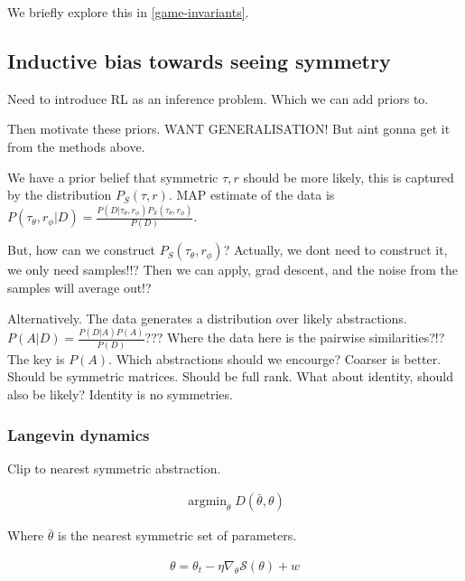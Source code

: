 We briefly explore this in \ref{game-invariants}.


\subsection{Inductive bias towards seeing symmetry}

Need to introduce RL as an inference problem. Which we can add priors to.

Then motivate these priors. WANT GENERALISATION! But aint gonna get it from the
methods above.




We have a prior belief that symmetric $\tau, r$ should be more likely, this is captured by the distribution $P_S(\tau, r)$.
MAP estimate of the data is $P(\tau_{\theta}, r_{\phi}| D) = \frac{P(D | \tau_{\theta}, r_{\phi})P_S(\tau_{\theta}, r_{\phi})}{P(D)}$.

But, how can we construct $P_S(\tau_{\theta}, r_{\phi})$?
Actually, we dont need to construct it, we only need samples!!?
Then we can apply, grad descent, and the noise from the samples will average out!?


Alternatively. The data generates a distribution over likely abstractions.
$P(A|D) = \frac{P(D|A)P(A)}{P(D)}$??? Where the data here is the pairwise similarities?!?
The key is $P(A)$. Which abstractions should we encourge? Coarser is better.
Should be symmetric matrices. Should be full rank. What about identity, should also be likely?
Identity is no symmetries.

\subsubsection{Langevin dynamics}

Clip to nearest symmetric abstraction.

\begin{align}
\mathop{\text{argmin}}_{\theta} D(\bar \theta, \theta)
\end{align}

Where $\bar \theta$ is the nearest symmetric set of parameters.

\begin{align}
\theta = \theta_t - \eta \nabla_\theta \mathcal S(\theta) + w
\end{align}

